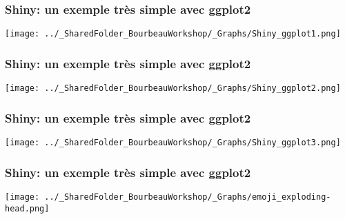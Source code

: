 \documentclass{beamer}
\begin{document}

    \begin{frame}
    
      \frametitle{Shiny: un exemple très simple avec ggplot2} \vspace{1cm}
      
        \begin{center}
      	  \texttt{[image: ../\_SharedFolder\_BourbeauWorkshop/\_Graphs/Shiny\_ggplot1.png]}
        \end{center} 
      
          
    \end{frame} 
    

    \begin{frame}
    
      \frametitle{Shiny: un exemple très simple avec ggplot2} \vspace{1cm}
      
        \begin{center}
      	  \texttt{[image: ../\_SharedFolder\_BourbeauWorkshop/\_Graphs/Shiny\_ggplot2.png]}
        \end{center} 
      
          
    \end{frame} 
    

    \begin{frame}
    
      \frametitle{Shiny: un exemple très simple avec ggplot2} \vspace{1cm}
      
        \begin{center}
      	  \texttt{[image: ../\_SharedFolder\_BourbeauWorkshop/\_Graphs/Shiny\_ggplot3.png]}
        \end{center} 
      
          
    \end{frame} 
    

    \begin{frame}
    
      \frametitle{Shiny: un exemple très simple avec ggplot2} \vspace{1cm}
      
        \begin{center}
      	  \texttt{[image: ../\_SharedFolder\_BourbeauWorkshop/\_Graphs/emoji\_exploding-head.png]}
        \end{center} 
      
          
    \end{frame}     
    
\end{document}
